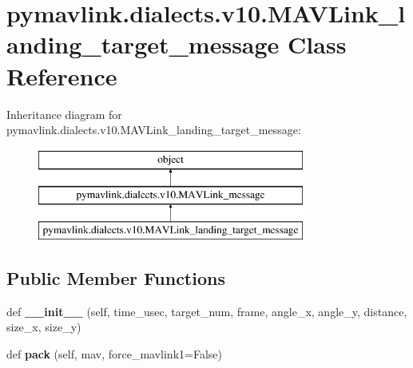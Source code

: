 \hypertarget{classpymavlink_1_1dialects_1_1v10_1_1MAVLink__landing__target__message}{}\section{pymavlink.\+dialects.\+v10.\+M\+A\+V\+Link\+\_\+landing\+\_\+target\+\_\+message Class Reference}
\label{classpymavlink_1_1dialects_1_1v10_1_1MAVLink__landing__target__message}
Inheritance diagram for pymavlink.\+dialects.\+v10.\+M\+A\+V\+Link\+\_\+landing\+\_\+target\+\_\+message\+:\begin{figure}[H]
\begin{center}
\leavevmode
\includegraphics[height=3.000000cm]{classpymavlink_1_1dialects_1_1v10_1_1MAVLink__landing__target__message}
\end{center}
\end{figure}
\subsection*{Public Member Functions}
\begin{DoxyCompactItemize}
\item 
\mbox{\label{classpymavlink_1_1dialects_1_1v10_1_1MAVLink__landing__target__message_ad406cef6be3fc58f1a25931aebdcca41}} 
def {\bfseries \+\_\+\+\_\+init\+\_\+\+\_\+} (self, time\+\_\+usec, target\+\_\+num, frame, angle\+\_\+x, angle\+\_\+y, distance, size\+\_\+x, size\+\_\+y)
\item 
\mbox{\label{classpymavlink_1_1dialects_1_1v10_1_1MAVLink__landing__target__message_a489caacb3d92f66ad0510bec51bc229a}} 
def {\bfseries pack} (self, mav, force\+\_\+mavlink1=False)
\end{DoxyCompactItemize}
